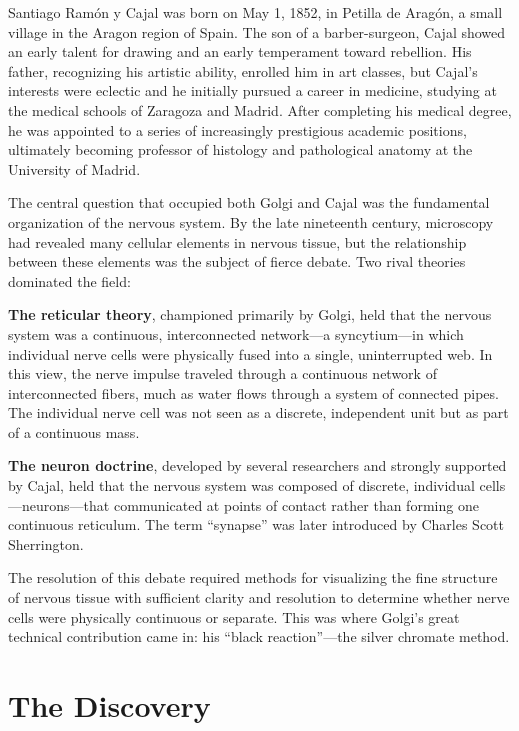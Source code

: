 Santiago Ram\'on y Cajal was born on May 1, 1852, in Petilla de Arag\'on, a small village in the Aragon region of Spain. The son of a barber-surgeon, Cajal showed an early talent for drawing and an early temperament toward rebellion. His father, recognizing his artistic ability, enrolled him in art classes, but Cajal's interests were eclectic and he initially pursued a career in medicine, studying at the medical schools of Zaragoza and Madrid. After completing his medical degree, he was appointed to a series of increasingly prestigious academic positions, ultimately becoming professor of histology and pathological anatomy at the University of Madrid.

The central question that occupied both Golgi and Cajal was the fundamental organization of the nervous system. By the late nineteenth century, microscopy had revealed many cellular elements in nervous tissue, but the relationship between these elements was the subject of fierce debate. Two rival theories dominated the field:

\textbf{The reticular theory}, championed primarily by Golgi, held that the nervous system was a continuous, interconnected network---a syncytium---in which individual nerve cells were physically fused into a single, uninterrupted web. In this view, the nerve impulse traveled through a continuous network of interconnected fibers, much as water flows through a system of connected pipes. The individual nerve cell was not seen as a discrete, independent unit but as part of a continuous mass.

\textbf{The neuron doctrine}, developed by several researchers and strongly supported by Cajal, held that the nervous system was composed of discrete, individual cells---neurons---that communicated at points of contact rather than forming one continuous reticulum. The term ``synapse'' was later introduced by Charles Scott Sherrington.\cite{golgi-cajal-history}

The resolution of this debate required methods for visualizing the fine structure of nervous tissue with sufficient clarity and resolution to determine whether nerve cells were physically continuous or separate. This was where Golgi's great technical contribution came in: his ``black reaction''---the silver chromate method.

\section{The Discovery}

